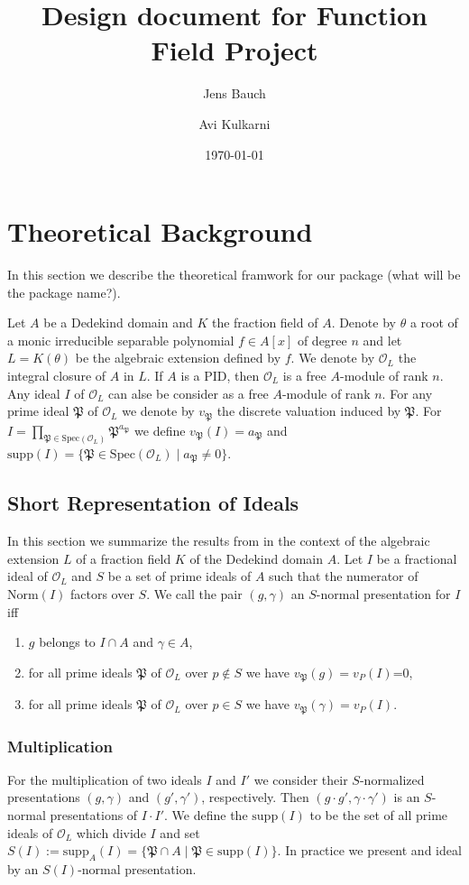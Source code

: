 \documentclass{amsart}
\title{Design document for Function Field Project}
\author{Jens Bauch}
\author{Avi Kulkarni}
\date{\today}
\theoremstyle{definition}
\def\P{\mathfrak{P}}
\def\su{\mathrm{supp}}
\def\oo{\mathcal{O}}
\def\NM{\mathrm{Norm}}
\begin{document}
	
\maketitle

\section{Theoretical Background}

In this section we describe the theoretical framwork for our package (what will be the package name?). 

Let $A$ be a Dedekind domain and $K$ the fraction field of $A$. Denote by $\theta$ a root of a monic irreducible separable polynomial $f\in A[x]$ of degree $n$ and let $L=K(\theta)$ be the algebraic extension defined by $f$. We denote by $\oo_L$ the integral closure of $A$ in $L$. If $A$ is a PID, then $\oo_L$ is a free $A$-module of rank $n$. Any ideal $I$ of $\oo_L$ can alse be consider as a free $A$-module of rank $n$. For any prime ideal $\P$ of $\oo_L$ we denote by $v_\P$ the discrete valuation induced by $\P$. For $I=\prod_{\P \in \mathrm{Spec}(\oo_L)}\P^{a_\P}$ we define $v_\P(I)= a_\P$ and $\su(I)=\{\P\in \mathrm{Spec}(\oo_L)\mid a_\P\neq 0\}$.
\subsection{Short Representation of Ideals}
In this section we summarize the results from \cite{Fieker} in the context of the algebraic extension $L$ of a fraction field $K$ of the Dedekind domain $A$. Let $I$ be a fractional ideal of $\oo_L$ and $S$ be a set of prime ideals of $A$ such that the numerator of $\NM(I)$ factors over $S$. We call the pair $(g,\gamma)$ an $S$-normal presentation for $I$ iff
\begin{enumerate}
\item $g$ belongs to $I\cap A$ and $\gamma\in A$,
\item  for all prime ideals $\P$ of $\oo_L$ over $p\notin S$ we have $v_\P(g)=v_P(I)$=0,
\item  for all prime ideals $\P$ of $\oo_L$ over $p\in S$ we have $v_\P(\gamma)=v_P(I)$.\label{for_gamma}
\end{enumerate}
\subsubsection{Multiplication}
For the multiplication of two ideals $I$ and $I'$ we consider their $S$-normalized presentations $(g,\gamma)$ and $(g',\gamma')$, respectively. Then $(g\cdot g',\gamma\cdot \gamma')$ is an $S$-normal presentations of $I\cdot I'$. We define the $\su(I)$ to be the set of all prime ideals of $\oo_L$ which divide $I$ and set $S(I):=\su_A(I) =\{\P\cap A\mid\P\in\su(I)\}$. In practice we present and ideal by an $S(I)$-normal presentation.
\end{document}
